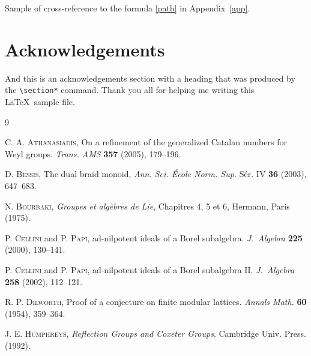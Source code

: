 \documentclass[pamq]{ipart}
\theoremstyle{plain}
\begin{document}
Sample of cross-reference to the formula \ref{path} in Appendix~\ref{app}.

\section*{Acknowledgements}
And this is an acknowledgements section with a heading that was produced by the
\verb|\section*| command. Thank you all for helping me writing this
\LaTeX\ sample file.

\begin{thebibliography}{9}

 \textsc{C. A. Athanasiadis}, On a refinement of the generalized
Catalan numbers for Weyl groups. \textit{Trans. AMS} \textbf{357} (2005), 179--196.

 \textsc{D. Bessis}, The dual braid monoid,
\textit{Ann. Sci. \'Ecole Norm. Sup.} S\'er. IV \textbf{36} (2003), 647--683.

 \textsc{N. Bourbaki},
\textit{Groupes et alg\`ebres de Lie}, Chapitres 4, 5 et 6, Hermann,
Paris (1975).

 \textsc{P. Cellini} and \textsc{P. Papi},
ad-nilpotent ideals of a Borel subalgebra. \textit{J.~Algebra} \textbf{225} (2000), 130--141.

 \textsc{P. Cellini} and \textsc{P. Papi},
ad-nilpotent ideals of a Borel subalgebra II. \textit{J.~Algebra} \textbf{258} (2002), 112--121.

\textsc{R. P. Dilworth},  Proof of a conjecture on finite modular
lattices.
\textit{Annals Math.} \textbf{60} (1954), 359--364.

\textsc{J. E. Humphreys},  \textit{Reflection Groups and Coxeter Groups}.
Cambridge Univ. Press. (1992).

\end{thebibliography}
\end{document}
